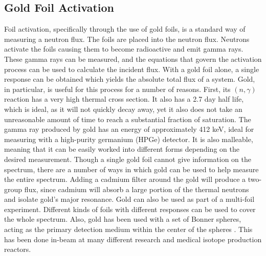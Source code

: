 \subsection{Gold Foil Activation}
Foil activation, specifically through the use of gold foils, is a standard way of measuring a neutron flux.
The foils are placed into the neutron flux.
Neutrons activate the foils causing them to become radioactive and emit gamma rays.
These gamma rays can be measured, and the equations that govern the activation process can be used to calculate the incident flux.
With a gold foil alone, a single response can be obtained which yields the absolute total flux of a system.
Gold, in particular, is useful for this process for a number of reasons.
First, its $(n, \gamma)$ reaction has a very high thermal cross section.
It also has a 2.7 day half life, which is ideal, as it will not quickly decay away, yet it also does not take an unreasonable amount of time to reach a substantial fraction of saturation.
The gamma ray produced by gold has an energy of approximately 412 keV, ideal for measuring with a high-purity germanium (HPGe) detector.
It is also malleable, meaning that it can be easily worked into different forms depending on the desired measurement.
Though a single gold foil cannot give information on the spectrum, there are a number of ways in which gold can be used to help measure the entire spectrum.
Adding a cadmium filter around the gold will produce a two-group flux, since cadmium will absorb a large portion of the thermal neutrons and isolate gold's major resonance.
Gold can also be used as part of a multi-foil experiment.
Different kinds of foils with different responses can be used to cover the whole spectrum.
Also, gold has been used with a set of Bonner spheres, acting as the primary detection medium within the center of the spheres \cite{viererbl2012comparison} \cite{wang2008goldbonner}.
This has been done in-beam at many different research and medical isotope production reactors.

